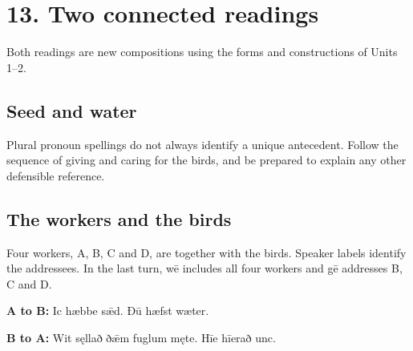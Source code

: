 \section*{13. Two connected readings}

Both readings are new compositions using the forms and constructions of Units 1–2.

\subsection*{Seed and water}

\par\begin{minipage}{\linewidth}\raggedright
{}
\end{minipage}\par

Plural pronoun spellings do not always identify a unique antecedent. Follow the sequence of giving and caring for the birds, and be prepared to explain any other defensible reference.

\subsection*{The workers and the birds}

Four workers, A, B, C and D, are together with the birds. Speaker labels identify the addressees. In the last turn, wē includes all four workers and gē addresses B, C and D.

\textbf{A to B:} Ic hæbbe sǣd. Ðū hæfst wæter.

\textbf{B to A:} Wit sęllað ðǣm fuglum męte. Hīe hīerað unc.

